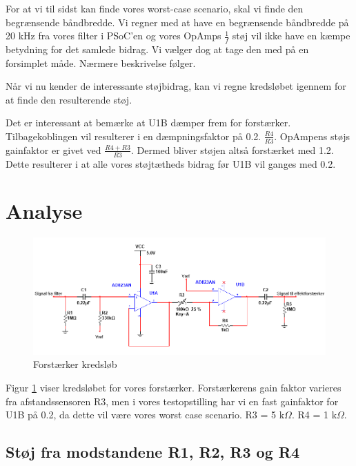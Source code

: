 \documentclass[a4paper, 11pt, article,oneside,openany]{memoir} %
\begin{document}
For at vi til sidst kan finde vores worst-case scenario, skal vi finde den begrænsende båndbredde. Vi regner med at have en begrænsende båndbredde på 20 kHz fra vores filter i PSoC'en og vores OpAmps $\frac{1}{f}$ støj vil ikke have en kæmpe betydning for det samlede bidrag. Vi vælger dog at tage den med på en forsimplet måde. Nærmere beskrivelse følger.

Når vi nu kender de interessante støjbidrag, kan vi regne kredsløbet igennem for at finde den resulterende støj.

Det er interessant at bemærke at U1B dæmper frem for forstærker. Tilbagekoblingen vil resulterer i en dæmpningsfaktor på 0.2. $\frac{R4}{R3}$.
OpAmpens støjs gainfaktor er givet ved $\frac{R4+R3}{R3}$. Dermed bliver støjen altså forstærket med 1.2.
Dette resulterer i at alle vores støjtætheds bidrag før U1B vil ganges med 0.2.

\section{Analyse}

\begin{figure}[ht] %
	\centering
	\includegraphics[width=\textwidth]{figure/kreds1}
	\caption{Forstærker kredsløb}
	\label{fig:kreds1}
\end{figure}
Figur \ref{fig:kreds1} viser kredsløbet for vores forstærker. Forstærkerens gain faktor varieres fra afstandssensoren R3, men i vores testopstilling har vi en fast gainfaktor for U1B på 0.2, da dette vil være vores worst case scenario. R3 = 5 $\si{\kilo\Omega}$. R4 = 1 $\si{\kilo\Omega}$.




\subsection{Støj fra modstandene R1, R2, R3 og R4}
\end{document}
